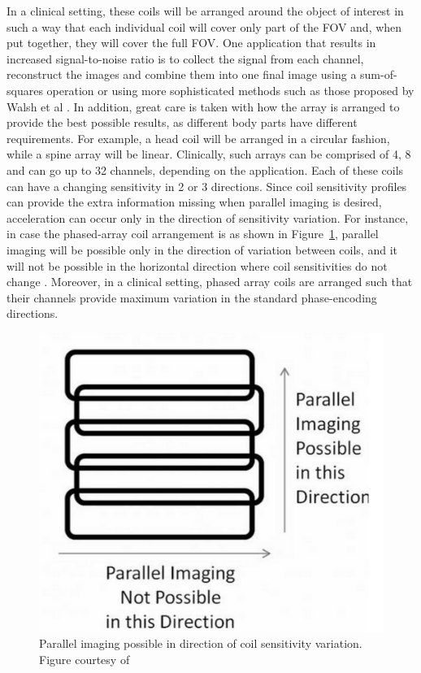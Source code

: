 In a clinical setting, these coils will be arranged around the object of interest in such a way that each individual coil will cover only part of the FOV and, when put together, they will cover the full FOV. One application that results in increased signal-to-noise ratio \cite{Hayes1991} is to collect the signal from each channel, reconstruct the images and combine them into one final image using a sum-of-squares operation \cite{Roemer1990} or using more sophisticated methods such as those proposed by Walsh et al \cite{Walsh2000}. In addition, great care is taken with how the array is arranged to provide the best possible results, as different body parts have different requirements. For example, a head coil will be arranged in a circular fashion, while a spine array will be linear. Clinically, such arrays can be comprised of 4, 8 and can go up to 32 channels, depending on the application. Each of these coils can have a changing sensitivity in 2 or 3 directions. Since coil sensitivity profiles can provide the extra information missing when parallel imaging is desired, acceleration can occur only in the direction of sensitivity variation. For instance, in case the phased-array coil arrangement is as shown in Figure~\ref{fig:5coils}, parallel imaging will be possible only in the direction of variation between coils, and it will not be possible in the horizontal direction where coil sensitivities do not change \cite{Deshmane2012}. Moreover, in a clinical setting, phased array coils are arranged such that their channels provide maximum variation in the standard phase-encoding directions. 

\begin{figure}[H]
    \centering
    \includegraphics[width=.6\textwidth,keepaspectratio]{5coils}
    \caption{Parallel imaging possible in direction of coil sensitivity variation. Figure courtesy of \cite{Deshmane2012}}
    \label{fig:5coils}
\end{figure}


